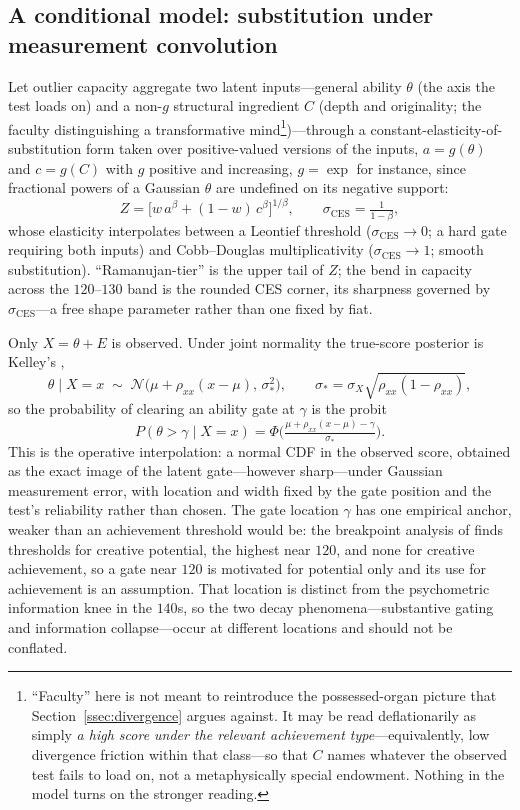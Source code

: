 \documentclass{article}
\begin{document}
\subsection{A conditional model: substitution under measurement convolution}\label{app:model}
Let outlier capacity aggregate two latent inputs---general ability $\theta$ (the axis the test loads on) and a non-$g$ structural ingredient $C$ (depth and originality; the faculty distinguishing a transformative mind\footnote{``Faculty'' here is not meant to reintroduce the possessed-organ picture that Section~\ref{ssec:divergence} argues against. It may be read deflationarily as simply \emph{a high score under the relevant achievement type}---equivalently, low divergence friction within that class---so that $C$ names whatever the observed test fails to load on, not a metaphysically special endowment. Nothing in the model turns on the stronger reading.})---through a constant-elasticity-of-substitution form \cite{arrow1961} taken over positive-valued versions of the inputs, $a = g(\theta)$ and $c = g(C)$ with $g$ positive and increasing, $g = \exp$ for instance, since fractional powers of a Gaussian $\theta$ are undefined on its negative support: \[ Z=\big[w\,a^{\beta}+(1-w)\,c^{\beta}\big]^{1/\beta},\qquad \sigma_{\mathrm{CES}}=\tfrac{1}{1-\beta}, \]
whose elasticity interpolates between a Leontief threshold ($\sigma_{\mathrm{CES}}\to 0$; a hard gate requiring both inputs) and Cobb--Douglas multiplicativity ($\sigma_{\mathrm{CES}}\to 1$; smooth substitution). ``Ramanujan-tier'' is the upper tail of $Z$; the bend in capacity across the $120$--$130$ band is the rounded CES corner, its sharpness governed by $\sigma_{\mathrm{CES}}$---a free shape parameter rather than one fixed by fiat.

Only $X=\theta+E$ is observed. Under joint normality the true-score posterior is Kelley's \cite{kelley1927},
\[
\theta\mid X=x\;\sim\;\mathcal N\!\big(\mu+\rho_{xx}(x-\mu),\,\sigma_{\ast}^{2}\big),
\qquad \sigma_{\ast}=\sigma_X\sqrt{\rho_{xx}(1-\rho_{xx})},
\]
so the probability of clearing an ability gate at $\gamma$ is the probit
\[
P(\theta>\gamma\mid X=x)=\Phi\!\Big(\tfrac{\mu+\rho_{xx}(x-\mu)-\gamma}{\sigma_{\ast}}\Big).
\]
This is the operative interpolation: a normal CDF in the observed score, obtained as the exact image of the latent gate---however sharp---under Gaussian measurement error, with location and width fixed by the gate position and the test's reliability rather than chosen. The gate location $\gamma$ has one empirical anchor, weaker than an achievement threshold would be: the breakpoint analysis of \cite{jauk2013} finds thresholds for creative potential, the highest near $120$, and none for creative achievement, so a gate near $120$ is motivated for potential only and its use for achievement is an assumption. That location is distinct from the psychometric information knee in the $140$s, so the two decay phenomena---substantive gating and information collapse---occur at different locations and should not be conflated.
\end{document}
